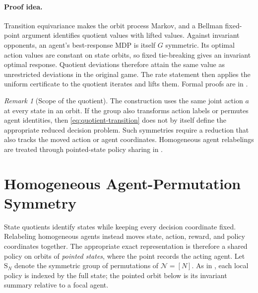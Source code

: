 \documentclass{article}
\theoremstyle{plain}
\theoremstyle{definition}
\theoremstyle{remark}
\newtheorem{remark}[theorem]{Remark}
\newcommand{\N}{\mathcal{N}}
\newcommand{\Sym}{\mathrm{S}}
\begin{document}
\paragraph{Proof idea.}
Transition equivariance makes the orbit process Markov, and a Bellman fixed-point
argument identifies quotient values with lifted values. Against invariant
opponents, an agent's best-response MDP is itself $G$ symmetric. Its optimal
action values are constant on state orbits, so fixed tie-breaking gives an
invariant optimal response. Quotient deviations therefore attain the same value
as unrestricted deviations in the original game. The rate statement then
applies the uniform certificate to the quotient iterates and lifts them.
Formal proofs are in
.

\begin{remark}[Scope of the quotient]
\label{rem:quotient-scope}
The construction uses the same joint action $a$ at every state in an orbit. If the
group also transforms action labels or permutes agent identities, then
\eqref{eq:quotient-transition} does not by itself define the appropriate reduced
decision problem. Such symmetries require a reduction that also tracks the moved
action or agent coordinates. Homogeneous agent relabelings are treated through
pointed-state policy sharing in .
\end{remark}

\section{Homogeneous Agent-Permutation Symmetry}
\label{sec:agent-permutations}

State quotients identify states while keeping every decision coordinate fixed.
Relabeling homogeneous agents instead moves state, action, reward, and policy
coordinates together. The appropriate exact representation is therefore a shared
policy on orbits of \emph{pointed states}, where the point records the acting agent.
Let $\Sym_N$ denote the symmetric group of permutations of $\N=[N]$.
As in , each local policy is indexed by the full state;
the pointed orbit below is its invariant summary relative to a focal agent.
\end{document}
